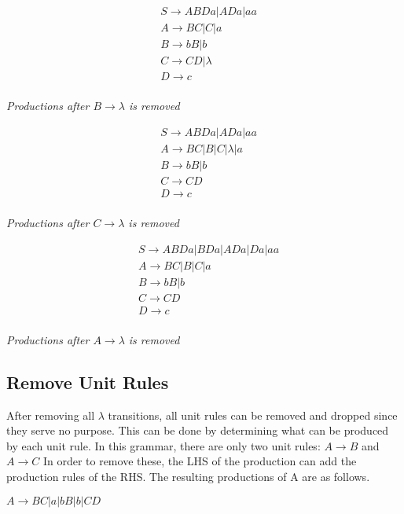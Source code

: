 \documentclass{assignment-x}
\begin{document}
\begin{multicols}{3}
    \begin{align*}
        &S \rightarrow ABDa|ADa|aa\\
        &A \rightarrow BC|C|a\\
        &B \rightarrow bB|b\\
        &C \rightarrow CD|\lambda\\
        &D \rightarrow c\\
    \end{align*}
    \begin{center}
        \textit{Productions after $B \rightarrow \lambda$ is removed}
    \end{center}
\columnbreak
    
    \begin{align*}
        &S \rightarrow ABDa|ADa|aa\\
        &A \rightarrow BC|B|C|\lambda|a\\
        &B \rightarrow bB|b\\
        &C \rightarrow CD\\
        &D \rightarrow c\\
    \end{align*}
    \begin{center}
        \textit{Productions after $C \rightarrow \lambda$ is removed}
    \end{center}
\columnbreak
    
    \begin{align*}
        &S \rightarrow ABDa|BDa|ADa|Da|aa\\
        &A \rightarrow BC|B|C|a\\
        &B \rightarrow bB|b\\
        &C \rightarrow CD\\
        &D \rightarrow c\\
    \end{align*}
    \begin{center}
        \textit{Productions after $A \rightarrow \lambda$ is removed}
    \end{center}
\end{multicols}
\pagebreak

\subsection{Remove Unit Rules}
After removing all $\lambda$ transitions, all unit rules can be removed and dropped since they serve no purpose.
This can be done by determining what can be produced by each unit rule.
In this grammar, there are only two unit rules: $A \rightarrow B$ and $A \rightarrow C$
In order to remove these, the LHS of the production can add the production rules of the RHS.
The resulting productions of A are as follows.
\begin{center}
    $A \rightarrow BC|a|bB|b|CD$
\end{center}
\end{document}
